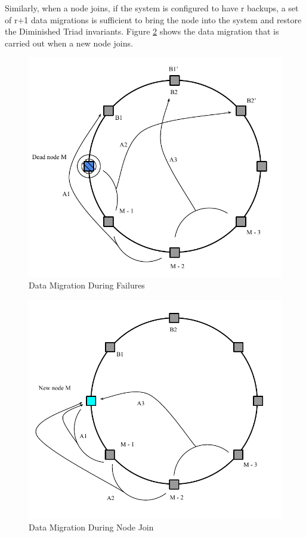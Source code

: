 \documentclass[10pt,twocolumn,letterpaper]{article}
\begin{document}
Similarly, when a node joins, if the system is configured to have r backups,  a set of r+1 data migrations is sufficient to bring the node into the system and restore the Diminished Triad invariants. Figure \ref{handlejoin} shows the data migration that is carried out when a new node joins. 

\begin{figure}[hbt]
  \centering
  \includegraphics[scale=0.7]{handle_dead}
  \caption{Data Migration During Failures}
  \label{handledead}
\end{figure}


\begin{figure}[hbt]
  \centering
  \includegraphics[scale=0.3]{handle_join}
  \caption{Data Migration During Node Join}
  \label{handlejoin}
\end{figure}
\end{document}
